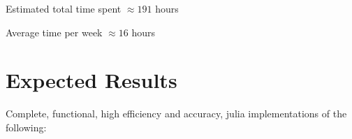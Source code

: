 \documentclass{article}
\theoremstyle{mytheoremstyle}
\theoremstyle{mytheoremstyle}
\theoremstyle{myproblemstyle}
\begin{document}
      \vspace{10}

      Estimated total time spent $\approx 191 $ hours 
      
      Average time per week $\approx 16 $ hours 
  
  \section*{Expected Results}\label{sec:Results} %
    Complete, functional, high efficiency and accuracy, julia implementations of the following:
  
    
\end{document}
